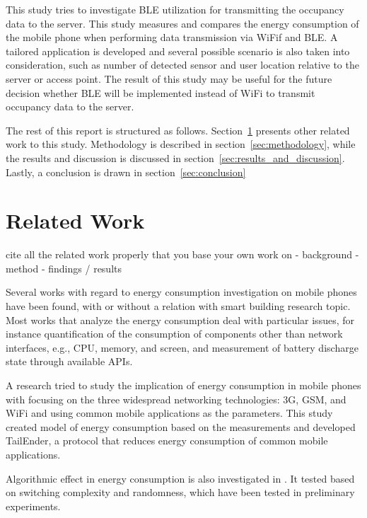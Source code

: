 \documentclass[journal]{vgtc}                %
\begin{document}
This study tries to investigate BLE utilization for transmitting the occupancy data to the server. This study measures and compares the energy consumption of the mobile phone when performing data transmission via WiFif and BLE. A tailored application is developed and several possible scenario is also taken into consideration, such as number of detected sensor and user location relative to the server or access point. The result of this study may be useful for the future decision whether BLE will be implemented instead of WiFi to transmit occupancy data to the server.

The rest of this report is structured as follows. Section~\ref{sec:related_work} presents other related work to this study. Methodology is described in section~\ref{sec:methodology}, while the results and discussion is discussed in section~\ref{sec:results_and_discussion}. Lastly, a conclusion is drawn in section~\ref{sec:conclusion}

\section{Related Work} %
\label{sec:related_work}
cite all the related work properly that you base your own work on
- background
- method
- findings / results

Several works with regard to energy consumption investigation on mobile phones have been found, with or without a relation with smart building research topic. Most works that analyze the energy consumption deal with particular issues, for instance quantification of the consumption of components other than network interfaces, e.g., CPU, memory, and screen, and measurement of battery discharge state through available APIs.

A research \cite{Balasubramanian2009} tried to study the implication of energy consumption in mobile phones with focusing on the three widespread networking technologies: 3G, GSM, and WiFi and using common mobile applications as the parameters. This study created model of energy consumption based on the measurements and developed TailEnder, a protocol that reduces energy consumption of common mobile applications.

Algorithmic effect in energy consumption is also investigated in \cite{Jain2005}. It tested based on switching complexity and randomness, which have been tested in preliminary experiments.
\end{document}
